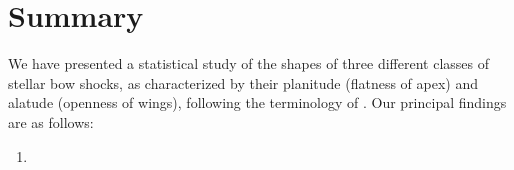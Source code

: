 
\section{Summary}
\label{sec:conclusion}

We have presented a statistical study of the shapes of three different
classes of stellar bow shocks, as characterized by their planitude
(flatness of apex) and alatude (openness of wings), following the
terminology of \citet[Paper~0]{Tarango-Yong:2018a}.  Our principal
findings are as follows:
\begin{enumerate}[1.]
\item 
\end{enumerate}










